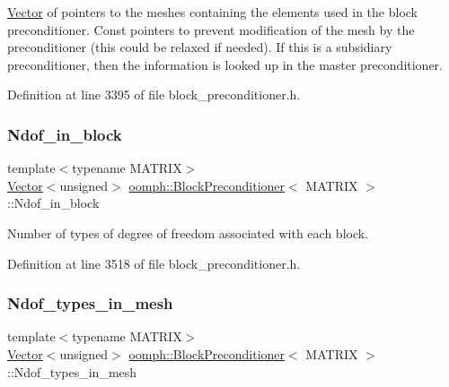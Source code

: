 \hyperlink{classoomph_1_1Vector}{Vector} of pointers to the meshes containing the elements used in the block preconditioner. Const pointers to prevent modification of the mesh by the preconditioner (this could be relaxed if needed). If this is a subsidiary preconditioner, then the information is looked up in the master preconditioner. 



Definition at line 3395 of file block\+\_\+preconditioner.\+h.

\mbox{\label{classoomph_1_1BlockPreconditioner_a874cbe5520d546ee24004e229a48037e}} 
\subsubsection{\texorpdfstring{Ndof\+\_\+in\+\_\+block}{Ndof\_in\_block}}
{\footnotesize\ttfamily template$<$typename M\+A\+T\+R\+IX$>$ \\
\hyperlink{classoomph_1_1Vector}{Vector}$<$unsigned$>$ \hyperlink{classoomph_1_1BlockPreconditioner}{oomph\+::\+Block\+Preconditioner}$<$ M\+A\+T\+R\+IX $>$\+::Ndof\+\_\+in\+\_\+block\hspace{0.3cm}{\ttfamily [private]}}



Number of types of degree of freedom associated with each block. 



Definition at line 3518 of file block\+\_\+preconditioner.\+h.

\mbox{\label{classoomph_1_1BlockPreconditioner_a43e9d73ff61daa00aea4e4deff0d6aff}} 
\subsubsection{\texorpdfstring{Ndof\+\_\+types\+\_\+in\+\_\+mesh}{Ndof\_types\_in\_mesh}}
{\footnotesize\ttfamily template$<$typename M\+A\+T\+R\+IX$>$ \\
\hyperlink{classoomph_1_1Vector}{Vector}$<$unsigned$>$ \hyperlink{classoomph_1_1BlockPreconditioner}{oomph\+::\+Block\+Preconditioner}$<$ M\+A\+T\+R\+IX $>$\+::Ndof\+\_\+types\+\_\+in\+\_\+mesh\hspace{0.3cm}{\ttfamily [protected]}}



